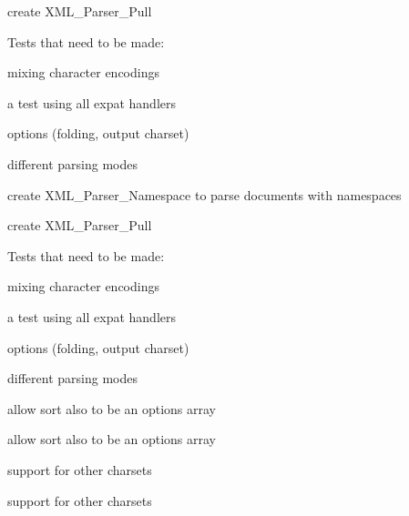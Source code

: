 \begin{DoxyRefList}
create X\+M\+L\+\_\+\+Parser\+\_\+\+Pull 

Tests that need to be made\+:
\begin{DoxyItemize}
\item mixing character encodings
\item a test using all expat handlers
\item options (folding, output charset)
\item different parsing modes 
\end{DoxyItemize}

\label{todo__todo000008}%
%
create X\+M\+L\+\_\+\+Parser\+\_\+\+Namespace to parse documents with namespaces 

create X\+M\+L\+\_\+\+Parser\+\_\+\+Pull 

Tests that need to be made\+:
\begin{DoxyItemize}
\item mixing character encodings
\item a test using all expat handlers
\item options (folding, output charset)
\item different parsing modes  
\end{DoxyItemize}
\item[Member \mbox{\hyperlink{classXML__Util_abb9a586675fbabe0f421b25c140e24fd}{X\+M\+L\+\_\+\+Util::attributes\+To\+String}} (\$attributes, \$sort=true, \$multiline=false, \$indent=\textquotesingle{} \textquotesingle{}, \$linebreak=\char`\"{}\textbackslash{}\textbackslash{}n\char`\"{}, \$entities=X\+M\+L\+\_\+\+U\+T\+I\+L\+\_\+\+E\+N\+T\+I\+T\+I\+E\+S\+\_\+\+X\+ML)]\label{todo__todo000006}%
%
allow sort also to be an options array 

\label{todo__todo000009}%
%
allow sort also to be an options array  
\item[Member \mbox{\hyperlink{classXML__Util_ab99420bf1a9588bfec428dd524870e1c}{X\+M\+L\+\_\+\+Util::is\+Valid\+Name}} (\$string)]\label{todo__todo000007}%
%
support for other charsets 

\label{todo__todo000010}%
%
support for other charsets 
\end{DoxyRefList}